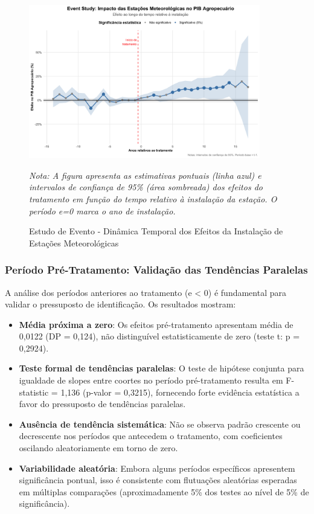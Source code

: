 \documentclass[
	12pt,				%
	oneside,			%
	a4paper,			%
	english,			%
	french,				%
	spanish,			%
	brazil				%
	]{abntex2}
\begin{document}
\begin{figure}[htbp]
\centering
\caption{Estudo de Evento - Dinâmica Temporal dos Efeitos da Instalação de Estações Meteorológicas}
\label{fig:eventstudy}
\includegraphics[width=0.9\textwidth]{../../../data/outputs/presentation/event_study_enhanced.png}

\textit{Nota: A figura apresenta as estimativas pontuais (linha azul) e intervalos de confiança de 95\% (área sombreada) dos efeitos do tratamento em função do tempo relativo à instalação da estação. O período e=0 marca o ano de instalação.}
\end{figure}

\subsubsection{Período Pré-Tratamento: Validação das Tendências Paralelas}

A análise dos períodos anteriores ao tratamento (e < 0) é fundamental para validar o pressuposto de identificação. Os resultados mostram:

\begin{itemize}
\item \textbf{Média próxima a zero}: Os efeitos pré-tratamento apresentam média de 0,0122 (DP = 0,124), não distinguível estatisticamente de zero (teste t: p = 0,2924).

\item \textbf{Teste formal de tendências paralelas}: O teste de hipótese conjunta para igualdade de slopes entre coortes no período pré-tratamento resulta em F-statistic = 1,136 (p-valor = 0,3215), fornecendo forte evidência estatística a favor do pressuposto de tendências paralelas.

\item \textbf{Ausência de tendência sistemática}: Não se observa padrão crescente ou decrescente nos períodos que antecedem o tratamento, com coeficientes oscilando aleatoriamente em torno de zero.

\item \textbf{Variabilidade aleatória}: Embora alguns períodos específicos apresentem significância pontual, isso é consistente com flutuações aleatórias esperadas em múltiplas comparações (aproximadamente 5\% dos testes ao nível de 5\% de significância).
\end{itemize}
\end{document}
